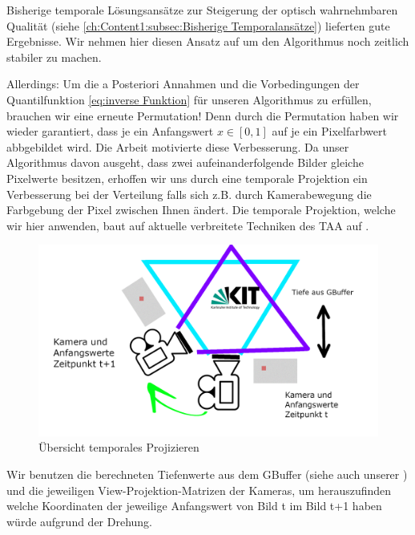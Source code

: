 Bisherige temporale Lösungsansätze zur Steigerung der optisch wahrnehmbaren Qualität (siehe \ref{ch:Content1:subsec:Bisherige Temporalansätze})
lieferten gute Ergebnisse. Wir nehmen hier diesen Ansatz auf um den Algorithmus noch zeitlich stabiler zu machen.
\par

Allerdings: Um die a Posteriori Annahmen und die Vorbedingungen der Quantilfunktion \ref{eq:inverse Funktion}
für unseren Algorithmus zu erfüllen, brauchen wir eine erneute Permutation! Denn durch die Permutation haben wir wieder garantiert, 
dass je ein Anfangswert $x \in [0,1]$ auf je ein Pixelfarbwert abbgebildet wird.
Die Arbeit \cite[S.9/10]{hal02158423} motivierte diese Verbesserung. Da unser Algorithmus davon ausgeht, dass zwei aufeinanderfolgende Bilder gleiche Pixelwerte 
besitzen, erhoffen wir uns durch eine temporale Projektion ein Verbesserung bei der  Verteilung 
falls sich z.B. durch Kamerabewegung die Farbgebung der Pixel zwischen Ihnen ändert. Die temporale Projektion, welche wir hier 
anwenden, baut auf aktuelle verbreitete Techniken des TAA auf \cite{INSIDETAA}.

\begin{figure}[H]
        \centering
        \includegraphics[width=\linewidth]{content/TemporalerAlg/Bilder/Reprojection/TemporalReprojectPrincipal.png}
        \caption{Übersicht temporales Projizieren}
        \label{pic:Uebersicht_Temporal_Reprojection}
\end{figure}

Wir benutzen die berechneten Tiefenwerte aus dem GBuffer (siehe auch unserer ) und die jeweiligen 
View-Projektion-Matrizen der Kameras, um herauszufinden welche Koordinaten der jeweilige Anfangswert von Bild t im Bild t+1 
haben würde aufgrund der Drehung.
\par 

